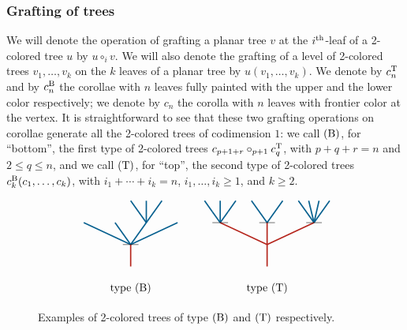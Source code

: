 \documentclass[twoside, 11pt]{amsart}
\theoremstyle{remark}
\begin{document}
\subsubsection{Grafting of trees} \label{sss:grafting}

We will denote the operation of grafting a planar tree $v$ at the $i^{\rm th}$-leaf of a 2-colored tree $u$ by $u \circ_i v$. 
We will also denote the grafting of a level of 2-colored trees $v_1, \ldots, v_k$ on the $k$ leaves of a planar tree by $u(v_1, \ldots, v_k)$. 
We denote by $c^{\mathrm{T}}_n$ and by $c^{\mathrm{B}}_n$ the corollae with $n$ leaves fully painted with the upper and the lower color respectively; we denote by $c_n$ the corolla with $n$ leaves with frontier color at the vertex. 
It is straightforward to see that these two grafting operations on corollae generate all the 2-colored trees of codimension $1$: we call $(\mathrm{B})$, for ``bottom'', the first type of 2-colored trees $c_{p+1+r}\circ_{p+1} c^{\mathrm{T}}_q$, with $p+q+r=n$ and $2\leq q\leq n$, and we call  $(\mathrm{T})$, for ``top'', the second type of 2-colored trees $c^{\mathrm{B}}_k(c_1, \ldots, c_k)$, with $i_1+\cdots+i_k=n$, $i_1, \ldots,i_k\geq 1$, and $k\geq 2$.

\begin{figure}[h]
\[\vcenter{\hbox{
\begin{tikzpicture}[yscale=0.7,xscale=1]
\draw[very thick, MidnightBlue] (0.5,1)--(0,2);
\draw[very thick, MidnightBlue] (0.5,1)--(0.5,2);
\draw[very thick, MidnightBlue] (0.5,1)--(1,2);
\draw[very thick, MidnightBlue] (0,0)--(0.5, 1); 
\draw[very thick, MidnightBlue] (0,0)--(-0.5, 1); 
\draw[very thick, MidnightBlue] (0,0)--(-1.5,1);
\draw[very thick, MidnightBlue] (0,0)--(1.5, 1);
\draw[very thick, BrickRed] (0,-1)--(0, 0); 
\draw (-0.25,0) to (0.25,0); 
\draw (0,-2) node {type $(\B)$};
\end{tikzpicture}}}\qquad \vcenter{\hbox{
\begin{tikzpicture}[yscale=0.7,xscale=1]
\draw[very thick, MidnightBlue] (-1.5,1)--(-1.5,2);
\draw[very thick, MidnightBlue] (-2,2) -- (-1.75,1.5);
\draw[very thick, MidnightBlue] (-1.25, 1.5) -- (-1,2);
\draw[very thick, MidnightBlue] (-0.5,2) -- (0,1);
\draw[very thick, MidnightBlue] (0,1)--(0.5,2);
\draw[very thick, MidnightBlue] (1.5,1)--(1,2);
\draw[very thick, MidnightBlue] (1.5,1)--(1.33,2);
\draw[very thick, MidnightBlue] (1.5,1)--(1.66,2);
\draw[very thick, MidnightBlue] (1.5,1)--(2,2);
\draw[very thick, MidnightBlue] (-1.5,1)--(-1.75, 1.5); 
\draw[very thick, MidnightBlue] (-1.5,1)--(-1.25, 1.5); 
\draw[very thick, BrickRed] (0,-1)--(0, 1); 
\draw[very thick, BrickRed] (0,0)--(-1.5,1);
\draw[very thick, BrickRed] (0,0)--(1.5, 1);
\draw (-1.75,1) to (-1.25,1); 
\draw (-0.25,1) to (0.25,1); 
\draw (1.25,1) to (1.75,1);
\draw (0,-2) node {type $(\T)$};
\end{tikzpicture}}}\]
\caption{Examples of 2-colored trees of type $(\mathrm{B})$ and $(\mathrm{T})$ respectively. }
\label{Fig5:FacetsColoredTrees}
\end{figure}
\end{document}
